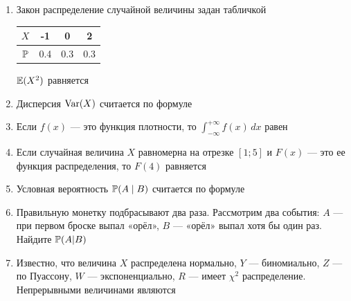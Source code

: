 \documentclass[12pt, a4paper]{article}\usepackage[]{graphicx}\usepackage[]{color}
\begin{document}
				\begin{enumerate}
					\item Закон распределение случайной величины задан табличкой


					\begin{tabular}{c|ccc}
						$X$ & -1 & 0 & 2 \\
						\hline
						$\P$ & 0.4 & 0.3 & 0.3 \\
					\end{tabular}


					$\E(X^2)$ равняется


					\item Дисперсия $\Var(X)$ считается по формуле


					\item Если $f(x)$ — это функция плотности, то $\int_{-\infty}^{+\infty}f(x)\,dx$ равен



					\item Если случайная величина $X$ равномерна на отрезке $[1;5]$ и $F(x)$ — это ее функция распределения, то $F(4)$ равняется


					\item Условная вероятность $\P(A\mid B)$ считается по формуле


					\item Правильную монетку подбрасывают два раза. Рассмотрим два события: $A$ — при первом броске выпал «орёл», $B$ — «орёл» выпал хотя бы один раз. Найдите $\P(A|B)$



					\item Известно, что величина $X$ распределена нормально, $Y$ — биномиально, $Z$ — по Пуассону, $W$ — экспоненциально, $R$ — имеет $\chi^2$ распределение. Непрерывными величинами являются


\end{enumerate}
\end{document}
